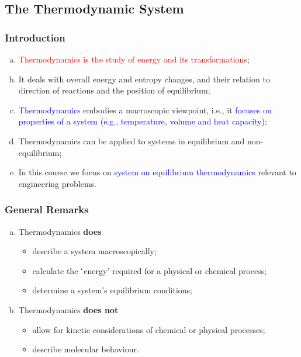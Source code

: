 \documentclass[10pt,compress]{beamer}
\newcommand{\red}{\textcolor{red}}
\newcommand{\blue}{\textcolor{blue}}
\begin{document}
\subsection{The Thermodynamic System}
\begin{frame}
 \frametitle{Introduction}
  \begin{enumerate}[(a)]
   \item <1-> \red{Thermodynamics is the study of energy and its transformations};
   \item <2-> It deals with overall energy and entropy changes, and their relation to direction of reactions and the position of equilibrium;
   \item <3-> \blue{Thermodynamics} embodies a macroscopic viewpoint, i.e., it \blue{focuses on properties of a system (e.g., temperature, volume and heat capacity)};
   \item <4-> Thermodynamics can be applied to systems in equilibrium and non-equilibrium;
   \item <5-> In this course we focus on \blue{system on equilibrium thermodynamics} relevant to engineering problems.     
  \end{enumerate}
\end{frame}

\begin{frame}
 \frametitle{General Remarks}
  \begin{enumerate}[(a)]
   \item <1-> Thermodynamics {\bf does}
     \begin{itemize}
       \item<2-> describe a system macroscopically;
       \item<2-> calculate the $\lq$energy' required for a physical or chemical process;
       \item<2-> determine a system's equilibrium conditions;
     \end{itemize}
   \item<3-> Thermodynamics {\bf does not}
     \begin{itemize}
       \item<4-> allow for kinetic considerations of chemical or physical processes;
       \item<4-> describe molecular behaviour.
     \end{itemize}
  \end{enumerate}
\end{frame}
\end{document}
